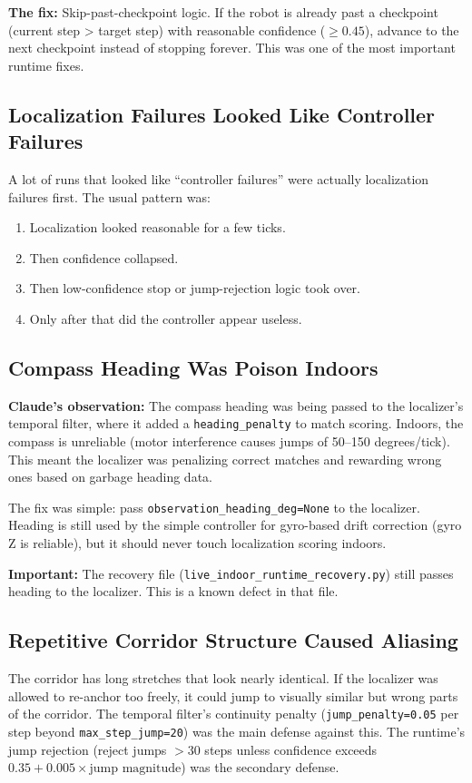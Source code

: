 \documentclass[11pt]{article}
\begin{document}
\textbf{The fix:} Skip-past-checkpoint logic. If the robot is already past a checkpoint (current step > target step) with reasonable confidence ($\geq 0.45$), advance to the next checkpoint instead of stopping forever. This was one of the most important runtime fixes.

\subsection{Localization Failures Looked Like Controller Failures}
A lot of runs that looked like ``controller failures'' were actually localization failures first. The usual pattern was:
\begin{enumerate}
\item Localization looked reasonable for a few ticks.
\item Then confidence collapsed.
\item Then low-confidence stop or jump-rejection logic took over.
\item Only after that did the controller appear useless.
\end{enumerate}

\subsection{Compass Heading Was Poison Indoors}
\textbf{Claude's observation:} The compass heading was being passed to the localizer's temporal filter, where it added a \texttt{heading\_penalty} to match scoring. Indoors, the compass is unreliable (motor interference causes jumps of 50--150 degrees/tick). This meant the localizer was penalizing correct matches and rewarding wrong ones based on garbage heading data.

The fix was simple: pass \texttt{observation\_heading\_deg=None} to the localizer. Heading is still used by the simple controller for gyro-based drift correction (gyro Z is reliable), but it should never touch localization scoring indoors.

\textbf{Important:} The recovery file (\texttt{live\_indoor\_runtime\_recovery.py}) still passes heading to the localizer. This is a known defect in that file.

\subsection{Repetitive Corridor Structure Caused Aliasing}
The corridor has long stretches that look nearly identical. If the localizer was allowed to re-anchor too freely, it could jump to visually similar but wrong parts of the corridor. The temporal filter's continuity penalty (\texttt{jump\_penalty=0.05} per step beyond \texttt{max\_step\_jump=20}) was the main defense against this. The runtime's jump rejection (reject jumps $>30$ steps unless confidence exceeds $0.35 + 0.005 \times \text{jump magnitude}$) was the secondary defense.
\end{document}
